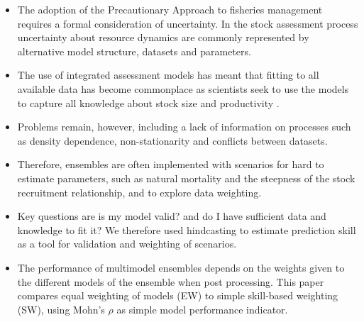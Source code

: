 \maketitle

\begin{abstract}
\end{abstract}
\fi

\maketitle


\begin{itemize}
    \item The adoption of the Precautionary Approach to fisheries management \citep[PA,][]{garcia1996precautionary} requires a formal consideration of uncertainty. In the stock assessment process uncertainty about resource dynamics are commonly represented by alternative model structure, datasets and parameters. 
    
    \item The use of integrated assessment models has meant that fitting to all available data has become commonplace as scientists seek to use the models to capture all knowledge about stock size and productivity \citep{hilborn2003state}. 
    
    \item %
    Problems remain, however, including a lack of information on processes such as density dependence, non-stationarity and conflicts between datasets. 
    
    \item Therefore, ensembles are often implemented with scenarios for hard to estimate parameters, such as natural mortality and the steepness of the stock recruitment relationship, and to explore data weighting.  
    
    \item Key questions are is my model valid? and do I have sufficient data and knowledge to fit it?  We therefore used hindcasting to estimate prediction skill as a tool for validation and weighting of scenarios. 
    
    \item The performance of multimodel ensembles depends on the weights given to the different models of the ensemble when post processing. This paper compares equal weighting of models (EW) to simple skill-based weighting (SW), using Mohn's $\rho$ as simple model performance indicator.
    
\end{itemize}

